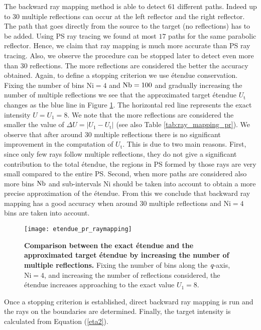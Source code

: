 The backward ray mapping method is able to detect $61$ different paths. Indeed up to $30$ multiple reflections can occur at the left reflector and the right reflector. The path that goes directly from the source to the target (no reflections) has to be added. Using PS ray tracing we found at most $17$ paths for the same parabolic reflector. Hence, we claim that ray mapping is much more accurate than PS ray tracing. Also, we observe the procedure can be stopped later to detect even more than $30$ reflections. The more reflections are considered the better the accuracy obtained. Again, to define a stopping criterion we use \'{e}tendue conservation. Fixing the number of bins $\textrm{Ni}=4$ and $\textrm{Nb}=100$ and gradually increasing the number of multiple reflections we see that the approximated target \'{e}tendue $U_{\textrm{t}}$ changes as the blue line in Figure \ref{fig:etendue_pr_raymapping}. The horizontal red line represents the exact intensity $U = U_{1} = 8$. We note that the more reflections are considered the smaller the value of $\Delta U = |U_1-U_{\textrm{t}}|$ (see also Table \ref{tab:ray_mapping_pr}). We observe that after around $30$ multiple reflections there is no significant improvement in the computation of $U_{\textrm{t}}$. This is due to two main reasons. First, since only few rays follow multiple reflections, they do not give a significant contribution to the total \'{e}tendue, the regions in PS formed by those rays are very small compared to the entire PS. Second, when more paths are considered also more bins $\textrm{Nb}$ and sub-intervals $\textrm{Ni}$ should be taken into account to obtain a more precise approximation of the \'{e}tendue. From this we conclude that backward ray mapping has a good accuracy when around $30$ multiple reflections and $\textrm{Ni}=4$ bins are taken into account.
\begin{figure}[h]
  \begin{center}
  \texttt{[image: etendue\_pr\_raymapping]}
  \end{center}
  \caption{\textbf{Comparison between the exact \'{e}tendue and the approximated target \'{e}tendue by increasing the number of multiple reflections.}
Fixing the number of bins along the $\textit{q}$-axis, $\textrm{Ni}=4$, and increasing the number of reflections considered, the \'{e}tendue increases approaching to the exact value $U_1=8$.}
\label{fig:etendue_pr_raymapping}
 \end{figure}
Once a stopping criterion is established, direct backward ray mapping is run and the rays on the boundaries are determined. Finally, the target intensity is calculated from Equation (\ref{eta2}). 
